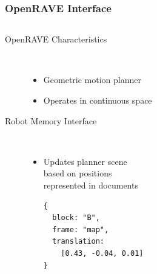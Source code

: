\begin{frame}[fragile]
  \frametitle{OpenRAVE Interface}
  \begin{columns}
    \begin{column}{0.6\textwidth}
  \begin{description}
  \item[OpenRAVE Characteristics]%
                \hfill \\
    \begin{itemize}
    \item Geometric motion planner
    \item Operates in continuous space
    \end{itemize}
  \item[Robot Memory Interface]%
                \hfill \\
    \begin{itemize}
    \item Updates planner scene\\ based on positions\\ represented in documents
\begin{lstlisting}[style=SmallJSON,
  framexleftmargin=5pt, xleftmargin=0pt,linewidth=5cm,
 morekeywords={}, numbers=none]
{
  block: "B",
  frame: "map",
  translation:
    [0.43, -0.04, 0.01]
}
\end{lstlisting}
    \end{itemize}
  \end{description}
    \end{column}
    \begin{column}{0.4\textwidth}

\end{column}
\end{columns}
\end{frame}
